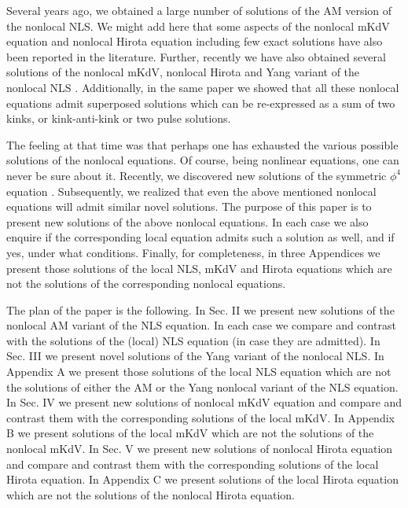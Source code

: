 \documentclass[11pt]{article}
\begin{document}
Several years ago, we 
obtained \cite{ks1, ks3} a large number of solutions of the AM version of the 
nonlocal NLS.  We might add here that some aspects of the nonlocal mKdV 
equation \cite{am3,am4,li,zh} and nonlocal Hirota equation \cite{li1} 
including few exact solutions have also been reported in the literature. 
Further, recently we have also 
obtained several solutions of the nonlocal mKdV, nonlocal Hirota and Yang 
variant of the nonlocal NLS \cite{ks2}. 
Additionally, in the same paper \cite{ks2} we showed that all these nonlocal 
equations admit superposed solutions which can be re-expressed as a sum of 
two kinks, or kink-anti-kink or two pulse solutions. 

The feeling at that time was that perhaps one has exhausted the various 
possible solutions of the nonlocal 
equations. Of course, being nonlinear equations, one can never be sure about it. 
Recently, we discovered new solutions of the symmetric $\phi^4$ equation 
\cite{kbs}. Subsequently, we realized that even the above mentioned nonlocal 
equations will admit similar novel solutions. The purpose of this paper is to present 
new solutions of the above nonlocal equations. In each case we also enquire if the 
corresponding local equation admits such a solution as well, and if yes, under 
what conditions. Finally, for completeness, in three Appendices we present those 
solutions of the local NLS, mKdV and Hirota equations which are not the solutions 
of the corresponding nonlocal equations.  

The plan of the paper is the following. In Sec. II we present new solutions of the 
nonlocal AM variant of the NLS equation. In each case we
compare and contrast with the solutions of the (local) NLS equation (in 
case they are admitted). In Sec. III we present novel solutions of the
Yang variant of the nonlocal NLS. In Appendix A we present those solutions 
of the local NLS equation which are not the solutions of either the AM or the 
Yang nonlocal variant of the NLS equation. In Sec. IV we present new 
solutions of nonlocal mKdV equation and compare and contrast them with the 
corresponding solutions of the local mKdV. In Appendix B we present 
solutions of the local mKdV which are not the solutions of the nonlocal
mKdV. In Sec. V we present new solutions of nonlocal Hirota equation 
and compare and contrast them with the corresponding solutions of the local 
Hirota equation. In Appendix C we present solutions of the local Hirota equation 
which are not the solutions of the nonlocal Hirota equation.
\end{document}
